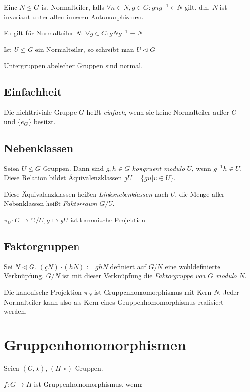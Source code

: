 Eine $N \leq G$ ist Normalteiler, falls $\forall n \in N, g \in G : gng^{-1} \in N$ gilt. d.h. $N$ ist invariant unter allen inneren Automorphismen.

Es gilt für Normalteiler $N$: $\forall g \in G : gNg^{-1} = N$

Ist $U \leq G$ ein Normalteiler, so schreibt man $U \triangleleft G$.

Untergruppen abelscher Gruppen sind normal.

\subsection*{Einfachheit}

Die nichttriviale Gruppe $G$ heißt \emph{einfach}, wenn sie keine Normalteiler außer $G$ und $\{e_G\}$ besitzt.

\subsection*{Nebenklassen}

Seien $U \leq G$ Gruppen. Dann sind $g, h \in G$ \emph{kongruent modulo $U$}, wenn $g^{-1}h \in U$. Diese Relation bildet Äquivalenzklassen $gU = \{gu | u \in U\}$.

Diese Äquivalenzklassen heißen \emph{Linksnebenklassen} nach $U$, die Menge aller Nebenklassen heißt \emph{Faktorraum} $G/U$.

$\pi_U : G \rightarrow G/U, g \mapsto gU$ ist kanonische Projektion.

\subsection*{Faktorgruppen}

Sei $N \triangleleft G$. $(gN) \cdot (hN) := ghN$ definiert auf $G/N$ eine wohldefinierte Verknüpfung. $G/N$ ist mit dieser Verknüpfung die \emph{Faktorgruppe von $G$ modulo $N$}.

Die kanonische Projektion $\pi_N$ ist Gruppenhomomorphismus mit Kern $N$. Jeder Normalteiler kann also als Kern eines Gruppenhomomorphismus realisiert werden.

\section*{Gruppenhomomorphismen}

Seien $(G,\star)$, $(H,\circ)$ Gruppen.

$f : G \rightarrow H$ ist Gruppenhomomorphismus, wenn:

